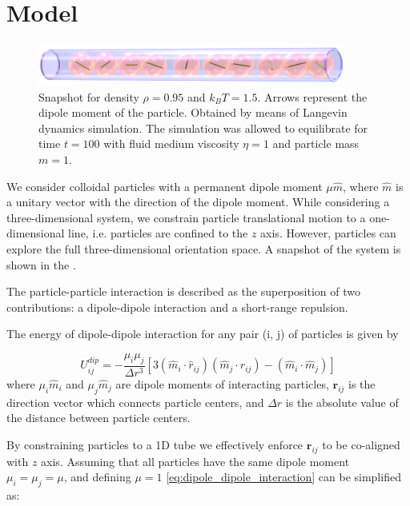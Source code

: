 \section{Model}
\label{sec:model}

\begin{figure}[t]
\centering
	\includegraphics[width=0.9\textwidth]{Images/fullSystemPicture}
	\captionsetup{justification=centering, width=0.9\textwidth}
	\caption{Snapshot for density $\rho = 0.95$ and $k_BT = 1.5$. Arrows represent the dipole moment of the particle. Obtained by means of Langevin dynamics simulation. The simulation was allowed to equilibrate for time $t = 100$ with fluid medium viscosity $\eta = 1$ and particle mass $m = 1$.}
	\label{fig:fullSystemPicture}
\end{figure}

We consider colloidal particles with a permanent dipole moment $\mu \hat{m}$, where $\hat{m}$ is a unitary vector with the direction of the dipole moment. While considering a three-dimensional system, we constrain particle translational motion to a one-dimensional line, i.e. particles are confined to the $z$ axis. However, particles can explore the full three-dimensional orientation space. A snapshot of the system is shown in the .

The particle-particle interaction is described as the superposition of two contributions: a dipole-dipole interaction and a short-range repulsion.

The energy of dipole-dipole interaction for any pair (i, j) of particles is given by

\begin{equation}
\label{eq:dipole_dipole_interaction}
U^{dip}_{ij} =
	- \frac{\mu_i \mu_j}{\Delta r^3}[
		3 (\hat{m}_i \cdot \hat{r}_{ij})(\hat{m}_j \cdot \hat{r}_{ij})
		- (\hat{m}_i \cdot \hat{m}_j)
	]
\end{equation}
where $\mu_i \hat{m}_i$ and $\mu_j \hat{m}_j$ are dipole moments of interacting particles, $\boldsymbol{r}_{ij}$ is the direction vector which connects particle centers, and $\Delta r$ is the absolute value of the distance between particle centers.

By constraining particles to a 1D tube we effectively enforce $\boldsymbol{r}_{ij}$ to be co-aligned with $z$ axis. Assuming that all particles have the same dipole moment $\mu_i = \mu_j = \mu$, and defining $\mu = 1$ \eqref{eq:dipole_dipole_interaction} can be simplified as:

